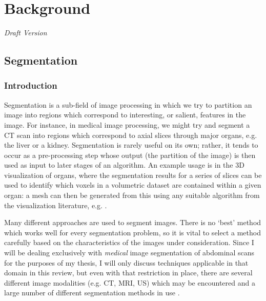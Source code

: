 \chapter{Background}
\label{chap:background}

\emph{Draft Version}

\section{Segmentation}

\subsection{Introduction}

Segmentation is a sub-field of image processing in which we try to partition an image into regions which correspond to interesting, or salient, features in the image. For instance, in medical image processing, we might try and segment a CT scan into regions which correspond to axial slices through major organs, e.g. the liver or a kidney. Segmentation is rarely useful on its own; rather, it tends to occur as a pre-processing step whose output (the partition of the image) is then used as input to later stages of an algorithm. An example usage is in the 3D visualization of organs, where the segmentation results for a series of slices can be used to identify which voxels in a volumetric dataset are contained within a given organ: a mesh can then be generated from this using any suitable algorithm from the visualization literature, e.g. \cite{cong05,lorensen87,wu03}.

Many different approaches are used to segment images. There is no `best' method which works well for every segmentation problem, so it is vital to select a method carefully based on the characteristics of the images under consideration. Since I will be dealing exclusively with \emph{medical} image segmentation of abdominal scans for the purposes of my thesis, I will only discuss techniques applicable in that domain in this review, but even with that restriction in place, there are several different image modalities (e.g. CT, MRI, US) which may be encountered and a large number of different segmentation methods in use \cite{pham00,varshney02}.

